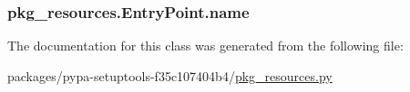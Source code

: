 \subsubsection[{name}]{\setlength{\rightskip}{0pt plus 5cm}pkg\+\_\+resources.\+Entry\+Point.\+name}\label{classpkg__resources_1_1EntryPoint_a91cc24785899a45662cb316373d754d5}


The documentation for this class was generated from the following file\+:\begin{DoxyCompactItemize}
\item 
packages/pypa-\/setuptools-\/f35c107404b4/\hyperlink{pkg__resources_8py}{pkg\+\_\+resources.\+py}\end{DoxyCompactItemize}
